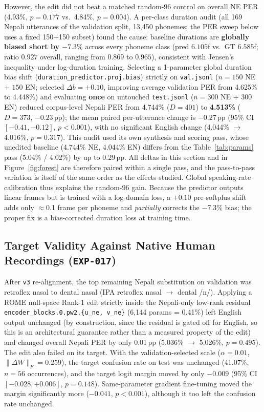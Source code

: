 However, the edit did not beat a matched random-96 control on overall NE PER (4.93\%, $p=0.177$ vs.\ 4.84\%, $p=0.004$). A per-class duration audit (all 169 Nepali utterances of the validation split, 13,450 phonemes; the PER sweep below uses a fixed 150+150 subset) found the cause: baseline durations are \textbf{globally biased short by $-7.3\%$} across every phoneme class (pred $6.105$f vs.\ GT $6.585$f; ratio $0.927$ overall, ranging from $0.869$ to $0.965$), consistent with Jensen's inequality under log-duration training. Selecting a 1-parameter global duration bias shift (\texttt{duration\_predictor.proj.bias}) strictly on \texttt{val.jsonl} ($n=150$ NE + $150$ EN; selected $\Delta b = +0.10$, improving average validation PER from 4.625\% to 4.448\%) and evaluating \textbf{once} on untouched \texttt{test.jsonl} ($n=300$ NE + $300$ EN) reduced corpus-level Nepali PER from 4.744\% ($D=401$) to \textbf{4.513\%} ($D=373$, $-0.23$\,pp); the mean paired per-utterance change is $-0.27$\,pp (95\% CI $[-0.41, -0.12]$, $p<0.001$), with no significant English change (4.044\% $\rightarrow$ 4.016\%, $p=0.317$). This audit used its own synthesis and scoring pass, whose unedited baseline (4.744\% NE, 4.044\% EN) differs from the Table~\ref{tab:params} pass (5.04\% / 4.02\%) by up to 0.29\,pp. All deltas in this section and in Figure~\ref{fig:forest} are therefore paired within a single pass, and the pass-to-pass variation is itself of the same order as the effects studied. Global speaking-rate calibration thus explains the random-96 gain. Because the predictor outputs linear frames but is trained with a log-domain loss, a $+0.10$ pre-softplus shift adds only $\approx$0.1 frame per phoneme and \emph{partially} corrects the $-7.3\%$ bias; the proper fix is a bias-corrected duration loss at training time.

\subsection{Target Validity Against Native Human Recordings (\texttt{EXP-017})}
After \texttt{v3} re-alignment, the top remaining Nepali substitution on validation was retroflex nasal to dental nasal (IPA retroflex nasal $\rightarrow$ dental /n/). Applying a ROME null-space Rank-1 edit strictly inside the Nepali-only low-rank residual \texttt{encoder\_blocks.0.pw2.\{u\_ne, v\_ne\}} (6,144 params = 0.41\%) left English output unchanged (by construction, since the residual is gated off for English, so this is an architectural guarantee rather than a measured property of the edit) and changed overall Nepali PER by only 0.01\,pp (5.036\% $\rightarrow$ 5.026\%, $p=0.495$). The edit also failed on its target. With the validation-selected scale ($\alpha=0.01$, $\lVert\Delta W\rVert_F=0.259$), the target confusion rate on test was unchanged (41.07\%, $n=56$ occurrences), and the target logit margin moved by only $-0.009$ (95\% CI $[-0.028, +0.006]$, $p=0.148$). Same-parameter gradient fine-tuning moved the margin significantly more ($-0.041$, $p<0.001$), although it too left the confusion rate unchanged.

